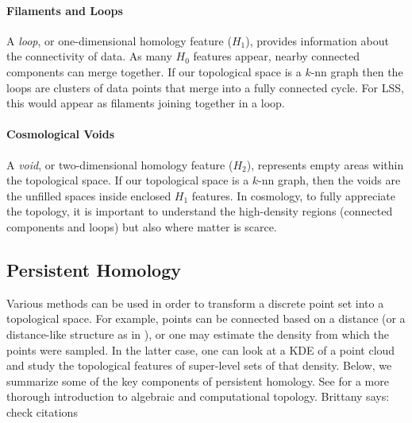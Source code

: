 \documentclass[12pt]{article}
\newcommand{\brittany}[1]{{\color{cyan} Brittany says: #1}}
\begin{document}
\paragraph{Filaments and Loops} A \emph{loop}, or one-dimensional homology feature ($H_1$), provides information about the connectivity of data. As many $H_0$ features appear, nearby connected components can merge together. If our topological space is a $k$-nn graph then the loops are clusters of data points that merge into a fully connected cycle.  For LSS, this would appear as filaments joining together in a loop.


\paragraph{Cosmological Voids}  A \emph{void}, or two-dimensional homology feature ($H_2$), represents empty areas within the topological space. If our topological space is a $k$-nn graph, then the voids are the unfilled spaces inside enclosed $H_1$ features.  In cosmology, to fully appreciate the topology, it is important to understand the high-density regions (connected components and loops) but also where matter is scarce. 

\subsection{Persistent Homology} 
Various methods can be used in order to transform a discrete point set into a topological space. For example, points can be connected based on a distance (or
a distance-like structure as in \cite{chazal2011geometric}), or one may estimate the density from which the points were sampled. 
In the latter case, one can look at a KDE of a point cloud and study the topological features of super-level sets of that density. Below, we summarize some of the key components of persistent homology. See \cite{edelsbrunner2010computational,hatcher2002algebraic,munkres1984elements} for a more thorough introduction to algebraic and computational topology. \brittany{check citations}
\end{document}
